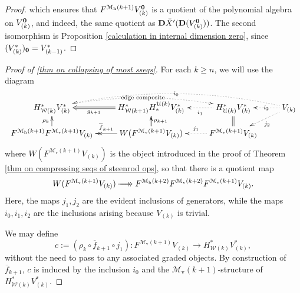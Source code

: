 \documentclass[11pt]{amsart} \renewcommand{\baselinestretch}{1.2}
\theoremstyle{plain}
\theoremstyle{definition}
\renewcommand{\to}{\longrightarrow}
\newcommand{\calU}{\mathcal{U}}
\newcommand{\calw}{\mathcal{W}}
\newcommand{\calMv}{\mathcal{M}\dver}
\newcommand{\calMh}{\mathcal{M}\dhor}
\newcommand{\epi}{{\,\makebox[0cm][l]{\ensuremath\to}\to{}}}
\newcommand{\UEAX}{\bar{X}'}%
\newcommand{\dver}{_\mathrm{v}}
\newcommand{\dhor}{_\mathrm{h}}
\newcommand{\dual}{\mathbf{D}}
\begin{document}
\begin{Calculations of HWn}
\begin{proof}
which ensures that $F^{\calMh(k+1)}V_{(k)}^{\textbf{\textup{0}}}$ is a quotient of the polynomial algebra on $V_{(k)}^{\textbf{\textup{0}}}$, and indeed, the same quotient as $\dual\UEAX(\dual(V_{(k)}^{\textbf{\textup{0}}}))$. The second isomorphism is Proposition \ref{calculation in internal dimension zero}, since $(V^*_{(k)})_{\textbf{\textup{0}}}=V^*_{(k-1)}$.
\end{proof}
\begin{proof}[Proof of \ref{thm on collapsing of most sseqs}]
For each $k\geq n$, we will use the diagram
\[\xymatrix@R=4mm{
H^*_{\calw(k)}V^*_{(k)}\ar@{..>}@/^1.22em/[rr]|-{\textup{\,edge composite\,}}
&H^*_{\calw(k+1)}H_*^{\calU(k)}V^*_{(k)}\ar@{=>}[l]^-{g_{k+1}}%
&H^*_{\calU(k)}V^*_{(k)}\ar@{..>}[l]^-{i_1}
&V_{(k)}\ar@{..>}[l]|-{\,i_2\,}\ar@{..>}[ld]^-{j_2}\ar@{..>}@/_1.72em/[lll]|-{\,i_0\,}
\\
F^{\calMh(k+1)}F^{\calMv(k+1)}V_{(k)}\ar[u]^-{\rho_k}
&W(F^{\calMv(k+1)}V_{(k)})\ar[u]\ar@{->>}[l]_-{\overline{f}_{k+1}}\ar[u]_-{\rho_{k+1}}
&F^{\calMv(k+1)}V_{(k)}\ar@{..>}[l]_-{j_1}\ar@{=}[u]%
}\]
where $W(F^{\calMv(k+1)}V_{(k)})$ is the object introduced in the proof of Theorem \ref{thm on compressing seqs of steenrod ops}, so that there is a quotient map
\[W(F^{\calMv(k+1)}V_{(k)})\epi F^{\calMh(k+2)}F^{\calMv(k+2)}F^{\calMv(k+1)}V_{(k)}.\]
Here, the maps $j_1,j_2$ are the evident inclusions of generators, while the maps $i_0,i_1,i_2$ are the inclusions arising because $V_{(k)}$ is trivial.

 We may define 
\[c:=(\rho_k\circ \overline{f}_{k+1}\circ j_1):F^{\calMv(k+1)}V_{(k)}\to H^*_{\calw(k)}V^*_{(k)},\]
without the need to pass to any associated graded objects. By construction of $\overline{f}_{k+1}$,  $c$ is induced by the inclusion $i_0$ and the $\calMv(k+1)$-structure of $H^*_{\calw(k)}V^*_{(k)}$.


\end{proof}
\end{Calculations of HWn}
\end{document}
